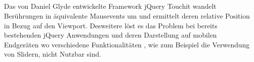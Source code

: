 	\subsection{}
	Das von Daniel Glyde entwickelte Framework jQuery Touchit wandelt Berührungen in äquivalente Mausevents um und ermittelt 	deren relative Position in Bezug auf den Viewport. Desweitere löst es das Problem bei bereits bestehenden jQuery 				Anwendungen und deren Darstellung auf mobilen Endgeräten wo verschiedene Funktionalitäten , wie zum Beispiel die 			Verwendung von Slidern, nicht Nutzbar sind.